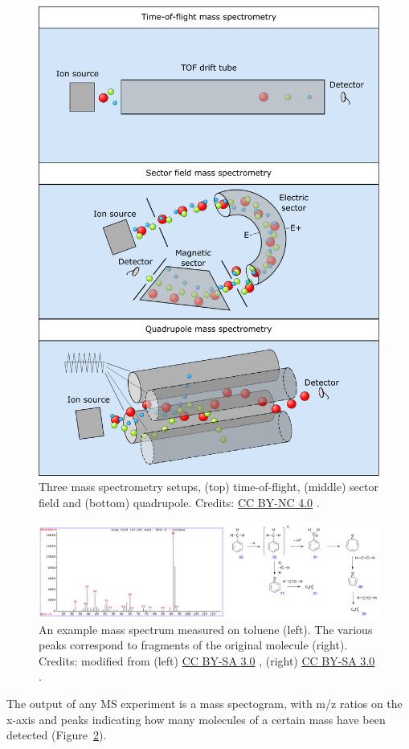\begin{framed}
\begin{figure}[!htbp]
\centering
\includegraphics[width=0.7\linewidth]{files/mass-spectrometry_al-ef48fd26c793a2135d7e8d5362597800.pdf}
\caption[]{Three mass spectrometry setups, (top) time-of-flight,
(middle) sector field and (bottom) quadrupole.
Credits: \href{https://creativecommons.org/licenses/by-nc/4.0/}{CC BY-NC 4.0} \cite{own_5_2024}.}
\label{mass_spectrometry_alt}
\end{figure}

\begin{figure}[!htbp]
\centering
\includegraphics[width=0.7\linewidth]{files/mass-spectrum-38bac03b7ea6e4b7427b61567e2f2ef9.png}
\caption[]{An example mass spectrum measured on toluene (left). The various peaks
correspond to fragments of the original molecule (right).
Credits: modified from (left) \href{https://creativecommons.org/licenses/by-sa/3.0/}{CC BY-SA 3.0} \cite{mass_spectrum_left_2005}, (right) \href{https://creativecommons.org/licenses/by-sa/3.0/}{CC BY-SA 3.0} \cite{mass_spectrum_right_2008}.}
\label{mass_spectrum}
\end{figure}

The output of any MS experiment is a mass spectogram, with m/z
ratios on the x-axis and peaks indicating how many molecules of a certain
mass have been detected (Figure~\ref{mass_spectrum}).
\end{framed}

